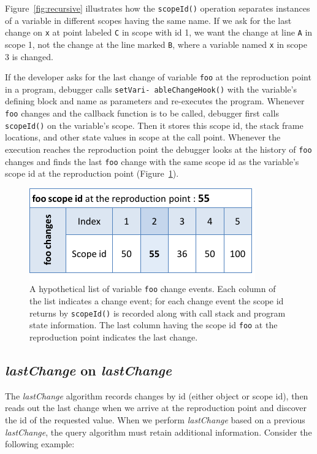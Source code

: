 \documentclass{sig-alternate}
\begin{document}
Figure~\ref{fig:recursive} illustrates how the \texttt{scopeId()} operation separates instances 
of a variable in different scopes having the same name.
If we ask for the last change on \texttt{x} at point labeled \texttt{C} in scope with id 1, we want the change at line \texttt{A} in scope 1, not 
the change at the line marked \texttt{B}, where a variable named \texttt{x} in scope 3 is changed.  


If the developer asks for the last change of variable \texttt{foo} at the 
reproduction point in a program, debugger calls 
\texttt{setVari- ableChangeHook()} with the variable's defining
block and name as parameters and re-executes the
program. Whenever \texttt{foo} changes and the callback function is to
be called, debugger first calls \texttt{scopeId()} on the
variable's scope. Then it stores this scope id, the stack
frame locations, and other state values in scope at the call point.
Whenever the execution reaches the reproduction point the debugger
looks at the history of \texttt{foo} changes and finds the last
\texttt{foo} change with the same scope id as the variable's scope id
at the reproduction point (Figure~\ref{fig:foo-changes2}). 

\begin{figure}[htp]
\centering 
\includegraphics[width=.40\textwidth]{7-foo-changes2.pdf}
\caption{A hypothetical list of variable \texttt{foo} change events. Each column of the list indicates a change event; for each
change event the scope id returns by \texttt{scopeId()} is recorded along with call stack and program state information. 
   The last column having the scope id \texttt{foo} at the reproduction point indicates 
  the last change.}
\label{fig:foo-changes2}
\end{figure}


\subsection{{\large\bf\textit{lastChange}} on {\large\bf\textit{lastChange}}}
The \textit{lastChange} algorithm records changes by id (either object or scope id), then reads out the last change when we
arrive at the reproduction point and discover the id of the requested value.
When we perform \textit{lastChange} based on a previous \textit{lastChange}, the query algorithm 
must retain additional information. Consider the following example:
\end{document}
